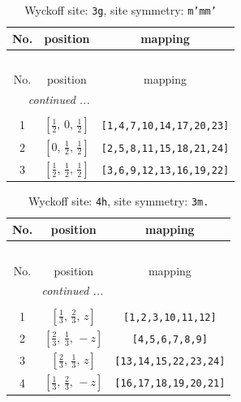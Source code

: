 \documentclass[fleqn,8pt]{jsarticle}
\begin{document}
\begin{longtable}{ccc}
\caption{Wyckoff site: {\tt 3g}, site symmetry: {\tt m'mm'}}
 \\
 \hline \hline
No. & position & mapping \\ \hline \endfirsthead

\multicolumn{2}{l}{\tablename\ \thetable{}} \\
 \hline \hline
No. & position & mapping \\ \hline \endhead

 \hline \hline
\multicolumn{2}{r}{\footnotesize\it continued ...} \\ \endfoot

 \hline \hline
\multicolumn{2}{r}{} \\ \endlastfoot

1 & $\left[ \frac{1}{2},\, 0,\, \frac{1}{2} \right]$ & {\tt [1,4,7,10,14,17,20,23]} \\ \hline
2 & $\left[ 0,\, \frac{1}{2},\, \frac{1}{2} \right]$ & {\tt [2,5,8,11,15,18,21,24]} \\ \hline
3 & $\left[ \frac{1}{2},\, \frac{1}{2},\, \frac{1}{2} \right]$ & {\tt [3,6,9,12,13,16,19,22]} \\
\end{longtable}
\renewcommand{\arraystretch}{1.2}
\begin{longtable}{ccc}
\caption{Wyckoff site: {\tt 4h}, site symmetry: {\tt 3m.}}
 \\
 \hline \hline
No. & position & mapping \\ \hline \endfirsthead

\multicolumn{2}{l}{\tablename\ \thetable{}} \\
 \hline \hline
No. & position & mapping \\ \hline \endhead

 \hline \hline
\multicolumn{2}{r}{\footnotesize\it continued ...} \\ \endfoot

 \hline \hline
\multicolumn{2}{r}{} \\ \endlastfoot

1 & $\left[ \frac{1}{3},\, \frac{2}{3},\, z \right]$ & {\tt [1,2,3,10,11,12]} \\ \hline
2 & $\left[ \frac{2}{3},\, \frac{1}{3},\, - z \right]$ & {\tt [4,5,6,7,8,9]} \\ \hline
3 & $\left[ \frac{2}{3},\, \frac{1}{3},\, z \right]$ & {\tt [13,14,15,22,23,24]} \\ \hline
4 & $\left[ \frac{1}{3},\, \frac{2}{3},\, - z \right]$ & {\tt [16,17,18,19,20,21]} \\
\end{longtable}
\end{document}
